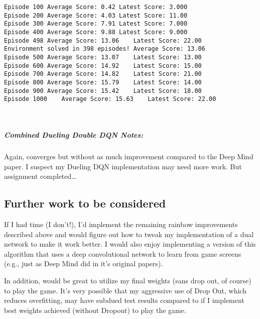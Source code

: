 \documentclass[11pt]{article}
\begin{document}
    \begin{Verbatim}[commandchars=\\\{\}]
Episode 100	Average Score: 0.42	Latest Score: 3.000
Episode 200	Average Score: 4.03	Latest Score: 11.00
Episode 300	Average Score: 7.91	Latest Score: 7.000
Episode 400	Average Score: 9.88	Latest Score: 9.000
Episode 498	Average Score: 13.06	Latest Score: 22.00
Environment solved in 398 episodes!	Average Score: 13.06
Episode 500	Average Score: 13.07	Latest Score: 13.00
Episode 600	Average Score: 14.92	Latest Score: 15.00
Episode 700	Average Score: 14.82	Latest Score: 21.00
Episode 800	Average Score: 15.79	Latest Score: 14.00
Episode 900	Average Score: 15.42	Latest Score: 18.00
Episode 1000	Average Score: 15.63	Latest Score: 22.00

    \end{Verbatim}

    \begin{center}
    \end{center}
    { \hspace*{\fill} \\}
    
    \hypertarget{combined-dueling-double-dqn-notes}{%
\subparagraph{Combined Dueling Double DQN
Notes:}\label{combined-dueling-double-dqn-notes}}

Again, converges but without as much improvement compared to the Deep
Mind paper. I suspect my Dueling DQN implementation may need more work.
But assignment completed\ldots{}

    \hypertarget{further-work-to-be-considered}{%
\subsection{Further work to be
considered}\label{further-work-to-be-considered}}

If I had time (I don't!), I'd implement the remaining rainbow
improvements described above and would figure out how to tweak my
implementation of a dual network to make it work better. I would also
enjoy implementing a version of this algorithm that uses a deep
convolutional network to learn from game screens (e.g., just as Deep
Mind did in it's original papers).

In addition, would be great to utilize my final weights (sans drop out,
of course) to play the game. It's very possible that my aggressive use
of Drop Out, which reduces overfitting, may have subdued test results
compared to if I implement best weights achieved (without Dropout) to
play the game.


    
    
    
    
\end{document}
